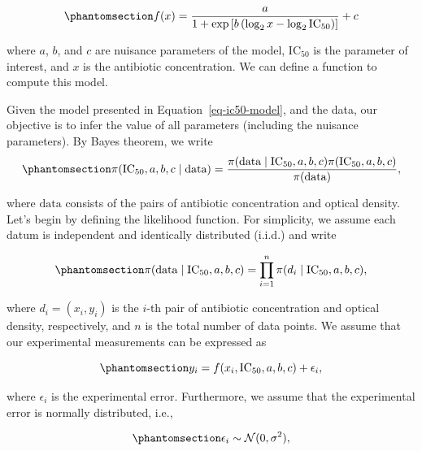 \documentclass[
]{scrartcl}
\begin{document}
\begin{refsection}
\begin{equation}\phantomsection\label{eq-ic50-model}{
f(x) = \frac{a}
{1+\exp \left[b\left(\log _2 x-\log _2 \mathrm{IC}_{50}\right)\right]} + c
}\end{equation}

where \(a\), \(b\), and \(c\) are nuisance parameters of the model,
\(\mathrm{IC}_{50}\) is the parameter of interest, and \(x\) is the
antibiotic concentration. We can define a function to compute this
model.

Given the model presented in Equation~\ref{eq-ic50-model}, and the data,
our objective is to infer the value of all parameters (including the
nuisance parameters). By Bayes theorem, we write
\begin{equation}\phantomsection\label{eq-bayes-ic50}{
\pi(\mathrm{IC}_{50}, a, b, c \mid \text{data}) = 
\frac{\pi(\text{data} \mid \mathrm{IC}_{50}, a, b, c) 
\pi(\mathrm{IC}_{50}, a, b, c)}
{\pi(\text{data})},
}\end{equation}

where \(\text{data}\) consists of the pairs of antibiotic concentration
and optical density. Let's begin by defining the likelihood function.
For simplicity, we assume each datum is independent and identically
distributed (i.i.d.) and write

\begin{equation}\phantomsection\label{eq-bayes-ic50-likelihood}{
\pi(\text{data} \mid \mathrm{IC}_{50}, a, b, c) = 
\prod_{i=1}^n \pi(d_i \mid \mathrm{IC}_{50}, a, b, c),
}\end{equation}

where \(d_i = (x_i, y_i)\) is the \(i\)-th pair of antibiotic
concentration and optical density, respectively, and \(n\) is the total
number of data points. We assume that our experimental measurements can
be expressed as

\begin{equation}\phantomsection\label{eq-bayes-ic50-likelihood-data}{
y_i = f(x_i, \mathrm{IC}_{50}, a, b, c) + \epsilon_i,
}\end{equation}

where \(\epsilon_i\) is the experimental error. Furthermore, we assume
that the experimental error is normally distributed, i.e.,

\begin{equation}\phantomsection\label{eq-bayes-ic50-likelihood-error}{
\epsilon_i \sim \mathcal{N}(0, \sigma^2),
}\end{equation}


\end{refsection}
\end{document}
